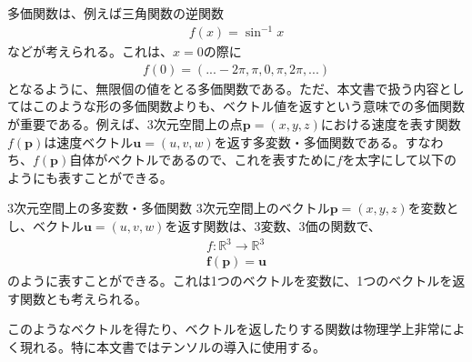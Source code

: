 多価関数は、例えば三角関数の逆関数
\begin{equation}
	\begin{aligned}
		f(x)=\sin^{-1}{x}
	\end{aligned}
\end{equation}
などが考えられる。これは、\(x=0\)の際に
\begin{equation}
	\begin{aligned}
		f(0)=(... -2\pi, \pi, 0, \pi, 2\pi, ...)
	\end{aligned}
\end{equation}
となるように、無限個の値をとる多価関数である。ただ、本文書で扱う内容としてはこのような形の多価関数よりも、ベクトル値を返すという意味での多価関数が重要である。例えば、3次元空間上の点\(\boldsymbol{p}=(x,y,z)\)における速度を表す関数\(f(\boldsymbol{p})\)は速度ベクトル\(\boldsymbol{u}=(u,v,w)\)を返す多変数・多価関数である。すなわち、\(f(\boldsymbol{p})\)自体がベクトルであるので、これを表すために\(f\)を太字にして以下のようにも表すことができる。
\begin{definition*}{3次元空間上の多変数・多価関数}
	3次元空間上のベクトル\(\boldsymbol{p}=(x,y,z)\)を変数とし、ベクトル\(\boldsymbol{u}=(u,v,w)\)を返す関数は、3変数、3価の関数で、
	\begin{equation}
		\begin{aligned}
			f: \mathbb{R}^3\rightarrow \mathbb{R}^3 \\
			\boldsymbol{f}(\boldsymbol{p})=\boldsymbol{u}
		\end{aligned}
	\end{equation}
	のように表すことができる。これは1つのベクトルを変数に、1つのベクトルを返す関数とも考えられる。
\end{definition*}
このようなベクトルを得たり、ベクトルを返したりする関数は物理学上非常によく現れる。特に本文書ではテンソルの導入に使用する。
